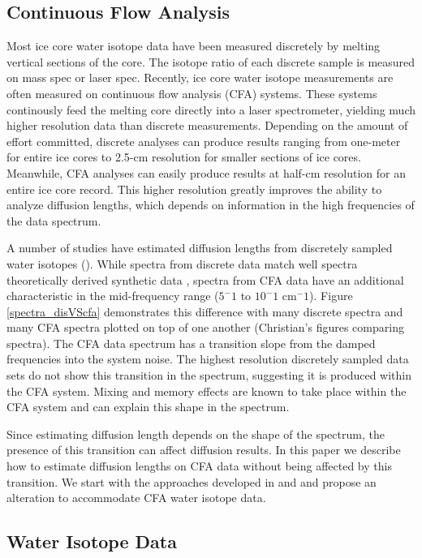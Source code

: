 \documentclass[draft, jgrga]{AGUTeX}
\begin{document}
\begin{article}
\subsection{Continuous Flow Analysis}

Most ice core water isotope data have been measured discretely by melting vertical sections of the core. The isotope ratio of each discrete sample is measured on mass spec or laser spec. Recently, ice core water isotope measurements are often measured on continuous flow analysis (CFA) systems. These systems continously feed the melting core directly into a laser spectrometer, yielding much higher resolution data than discrete measurements. Depending on the amount of effort committed, discrete analyses can produce results ranging from one-meter for entire ice cores to 2.5-cm resolution for smaller sections of ice cores. Meanwhile, CFA analyses can easily produce results at half-cm resolution for an entire ice core record. This higher resolution greatly improves the ability to analyze diffusion lengths, which depends on information in the high frequencies of the data spectrum.

A number of studies have estimated diffusion lengths from discretely sampled water isotopes (\citep{Johnsen2000,Simonsen2011,Gkinis2014,VanderWel2015}). While spectra from discrete data match well spectra theoretically derived synthetic data \citep{Holme2017}, spectra from CFA data have an additional characteristic in the mid-frequency range ($5^-1$ to $10^-1$ cm$^-1$). Figure \ref{spectra_disVScfa} demonstrates this difference with many discrete spectra and many CFA spectra plotted on top of one another (Christian's figures comparing spectra). The CFA data spectrum has a transition slope from the damped frequencies into the system noise. The highest resolution discretely sampled data sets do not show this transition in the spectrum, suggesting it is produced within the CFA system. Mixing and memory effects are known to take place within the CFA system and can explain this shape in the spectrum.

Since estimating diffusion length depends on the shape of the spectrum, the presence of this transition can affect diffusion results. In this paper we describe how to estimate diffusion lengths on CFA data without being affected by this transition. We start with the approaches developed in \citet{Johnsen2000} and \citet{Gkinis2014} and propose an alteration to accommodate CFA water isotope data.

\subsection{Water Isotope Data}


\end{article}
\end{document}
